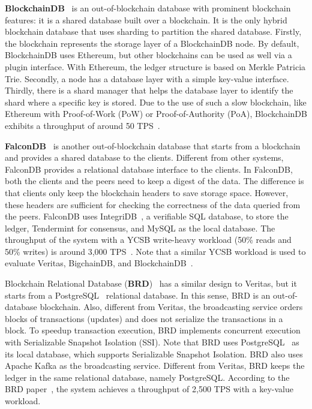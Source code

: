 \documentclass[11pt]{article}
\begin{document}
\textbf{BlockchainDB}~\cite{blockchaindb} is an out-of-blockchain database with prominent blockchain features: it is a shared database built over a blockchain. It is the only hybrid blockchain database that uses sharding to partition the shared database. Firstly, the blockchain represents the storage layer of a BlockchainDB node. By default, BlockchainDB uses Ethereum, but other blockchains can be used as well via a plugin interface. With Ethereum, the ledger structure is based on Merkle Patricia Trie. Secondly, a node has a database layer with a simple key-value interface. Thirdly, there is a shard manager that helps the database layer to identify the shard where a specific key is stored. Due to the use of such a slow blockchain, like Ethereum with Proof-of-Work (PoW) or Proof-of-Authority (PoA), BlockchainDB exhibits a throughput of around 50 TPS~\cite{loghin_vldb2022}.


\textbf{FalconDB}~\cite{falcondb} is another out-of-blockchain database that starts from a blockchain and provides a shared database to the clients. Different from other systems, FalconDB provides a relational database interface to the clients. In FalconDB, both the clients and the peers need to keep a digest of the data. The difference is that clients only keep the blockchain headers to save storage space. However, these headers are sufficient for checking the correctness of the data queried from the peers. FalconDB uses IntegriDB~\cite{integridb}, a verifiable SQL database, to store the ledger, Tendermint for consensus, and MySQL as the local database. The throughput of the system with a YCSB write-heavy workload (50\% reads and 50\% writes) is around 3,000 TPS~\cite{falcondb}. Note that a similar YCSB workload is used to evaluate Veritas, BigchainDB, and BlockchainDB~\cite{loghin_vldb2022}.


Blockchain Relational Database (\textbf{BRD})~\cite{brd} has a similar design to Veritas, but it starts from a PostgreSQL~\cite{postgresql_site} relational database. In this sense, BRD is an out-of-database blockchain. Also, different from Veritas, the broadcasting service orders blocks of transactions (updates) and does not serialize the transactions in a block. To speedup transaction execution, BRD implements concurrent execution with Serializable Snapshot Isolation (SSI). Note that BRD uses PostgreSQL~\cite{postgresql_site} as its local database, which supports Serializable Snapshot Isolation. BRD also uses Apache Kafka as the broadcasting service. Different from Veritas, BRD keeps the ledger in the same relational database, namely PostgreSQL. According to the BRD paper~\cite{brd}, the system achieves a throughput of 2,500 TPS with a key-value workload.
\end{document}
